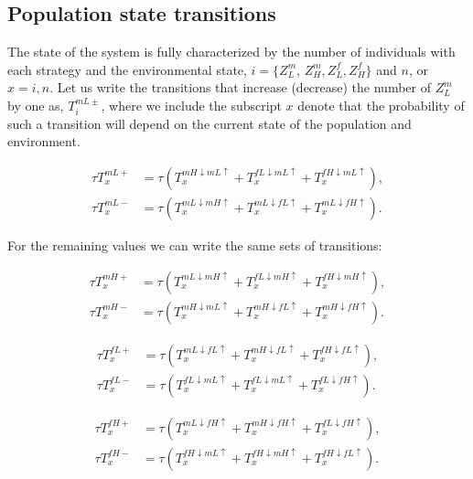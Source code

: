 \documentclass{article}
\begin{document}
\subsection{Population state transitions}
The state of the system is fully characterized by the number of individuals with each strategy and the environmental state, $i=\{Z^m_L$, $Z^m_H, Z^f_L, Z^f_H\}$ and $n$, or $x={i,n}$. Let us write the transitions that increase (decrease) the number of $Z^m_L$ by one as, $T^{mL\pm}_i$, where we include the subscript $x$ denote that the probability of such a transition will depend on the current state of the population and environment.

\begin{align}
\tau T^{mL+}_x &=
    \tau
    ( T^{mH\downarrow mL\uparrow}_x
    + T^{fL\downarrow mL\uparrow}_x
    + T^{fH\downarrow mL\uparrow}_x),\\
\tau T^{mL-}_x &=
    \tau
        (T^{mL\downarrow mH\uparrow}_x
        + T^{mL\downarrow fL\uparrow}_x
        + T^{mL\downarrow fH\uparrow}_x).
\end{align}

For the remaining values we can write the same sets of transitions:

\begin{align}
\tau T^{mH+}_x &=\tau
    ( T^{mL\downarrow mH\uparrow}_x
    + T^{fL\downarrow mH\uparrow}_x
    + T^{fH\downarrow mH\uparrow}_x),\\
\tau T^{mH-}_x &=
    \tau 
        (T^{mH\downarrow mL\uparrow}_x
        + T^{mH\downarrow fL\uparrow}_x
        + T^{mH\downarrow fH\uparrow}_x).
\end{align}

\begin{align}
\tau T^{fL+}_x &=
    \tau
    ( T^{mL\downarrow fL\uparrow}_x
    + T^{mH\downarrow fL\uparrow}_x
    + T^{fH\downarrow fL\uparrow}_x),\\
\tau T^{fL-}_x &=
    \tau 
        (T^{fL\downarrow mL\uparrow}_x
        + T^{fL\downarrow mL\uparrow}_x
        + T^{fL\downarrow fH\uparrow}_x).
\end{align}

\begin{align}
\tau T^{fH+}_x &=
    \tau
    ( T^{mL\downarrow fH\uparrow}_x
    + T^{mH\downarrow fH\uparrow}_x
    + T^{fL\downarrow fH\uparrow}_x),\\
\tau T^{fH-}_x &=
    \tau 
        (T^{fH\downarrow mL\uparrow}_x
        + T^{fH\downarrow mH\uparrow}_x
        + T^{fH\downarrow fL\uparrow}_x).
\end{align}
\end{document}
